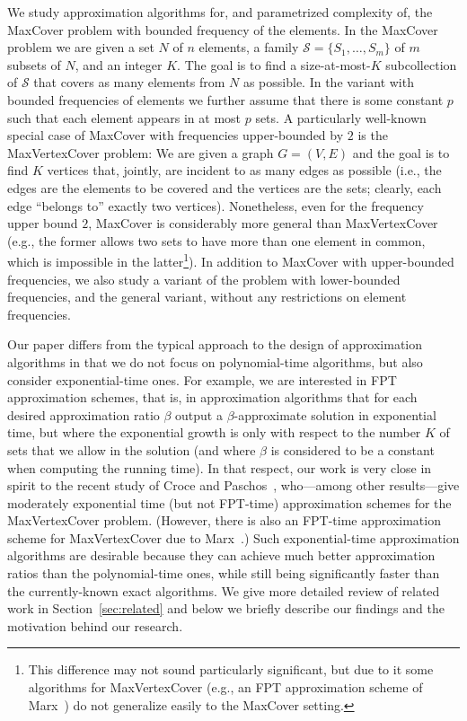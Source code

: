 \documentclass[11pt]{article}
\newcommand{\calS}{{{\mathcal{S}}}}
\begin{document}
We study approximation algorithms for, and parametrized complexity of,
the MaxCover problem with bounded frequency of the elements. In the
MaxCover problem we are given a set $N$ of $n$ elements, a family
$\calS = \{S_1, \ldots, S_m\}$ of $m$ subsets of $N$, and an integer
$K$. The goal is to find a size-at-most-$K$ subcollection of $\calS$
that covers as many elements from $N$ as possible. In the variant with
bounded frequencies of elements we further assume that there is some
constant $p$ such that each element appears in at most $p$ sets. A
particularly well-known special case of MaxCover with frequencies
upper-bounded by $2$ is the MaxVertexCover problem: We are given a
graph $G = (V,E)$ and the goal is to find $K$ vertices that, jointly,
are incident to as many edges as possible (i.e., the edges are the
elements to be covered and the vertices are the sets; clearly, each
edge ``belongs to'' exactly two vertices). Nonetheless, even for the
frequency upper bound $2$, MaxCover is considerably more general than
MaxVertexCover (e.g., the former allows two sets to have more than one
element in common, which is impossible in the latter\footnote{This
  difference may not sound particularly significant, but due to it
  some algorithms for MaxVertexCover (e.g., an FPT approximation
  scheme of Marx~\cite{Marx06parameterizedcomplexity}) do not
  generalize easily to the MaxCover setting.}).
In addition to MaxCover with upper-bounded frequencies, we also study
a variant of the problem with lower-bounded frequencies, and the
general variant, without any restrictions on element frequencies.

Our paper differs from the typical approach to the design of
approximation algorithms in that we do not focus on polynomial-time
algorithms, but also consider exponential-time ones.  For example, we
are interested in FPT approximation schemes, that is, in approximation
algorithms that for each desired approximation ratio $\beta$ output a
$\beta$-approximate solution in exponential time, but where the
exponential growth is only with respect to the number $K$ of sets that
we allow in the solution (and where $\beta$ is considered to be a
constant when computing the running time). In that respect, our work
is very close in spirit to the recent study of Croce and
Paschos~\cite{cro-pas:j:cover}, who---among other results---give
moderately exponential time (but not FPT-time) approximation schemes
for the MaxVertexCover problem. (However, there is also an FPT-time
approximation scheme for MaxVertexCover due to
Marx~\cite{Marx06parameterizedcomplexity}.)  Such exponential-time
approximation algorithms are desirable because they can achieve much
better approximation ratios than the polynomial-time ones, while still
being significantly faster than the currently-known exact
algorithms. We give more detailed review of related work in
Section~\ref{sec:related} and below we briefly describe our findings
and the motivation behind our research.
\end{document}
